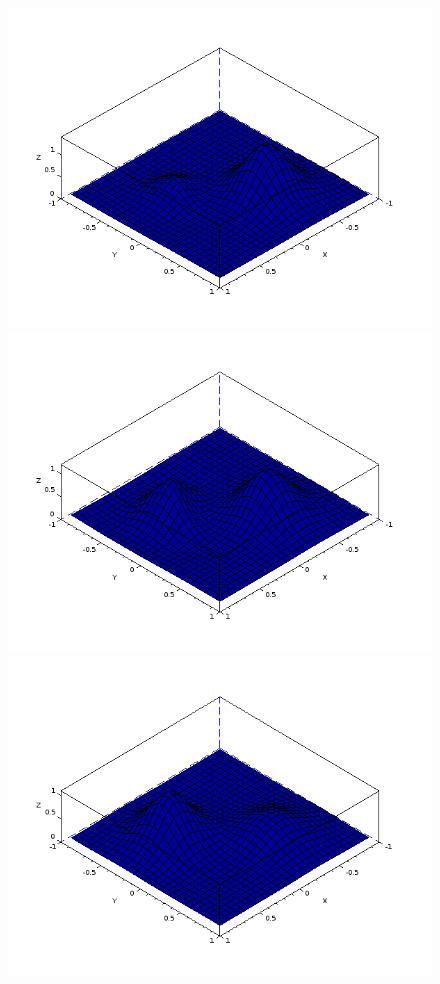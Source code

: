 \documentclass[12pt,a4paper,twoside]{article}
\begin{document}
\begin{figure}
\begin{center}
\includegraphics[scale=0.35]{Images/deplace1.png}
\includegraphics[scale=0.35]{Images/deplace2.png}
\includegraphics[scale=0.35]{Images/deplace3.png}

\end{center}
\end{figure}
\end{document}
